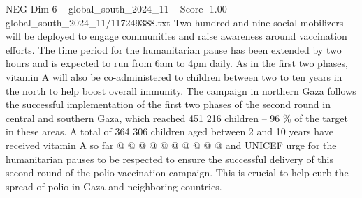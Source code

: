 \begin{textsample}{NEG Dim 6 – global\_south\_2024\_11 – Score -1.00 – global\_south\_2024\_11/117249388.txt}
Two hundred and nine social mobilizers will be deployed to engage communities and raise awareness around vaccination efforts.
The time period for the humanitarian pause has been extended by two hours and is expected to run from 6am to 4pm daily.
As in the first two phases, vitamin A will also be co-administered to children between two to ten years in the north to help boost overall immunity.
The campaign in northern Gaza follows the successful implementation of the first two phases of the second round in central and southern Gaza, which reached 451 216 children -- 96 \% of the target in these areas.
A total of 364 306 children aged between 2 and 10 years have received vitamin A so far @ @ @ @ @ @ @ @ @ @ and UNICEF urge for the humanitarian pauses to be respected to ensure the successful delivery of this second round of the polio vaccination campaign.
This is crucial to help curb the spread of polio in Gaza and neighboring countries.

\end{textsample}
